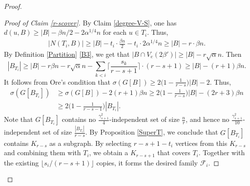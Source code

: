 \documentclass[11pt, a4paper]{article}
\theoremstyle{definition}
\newcommand{\<}{\subseteq}
\begin{document}
\begin{proof}
\begin{proof}[Proof of Claim \ref{r-scover}]
By Claim \ref{degree-V-S}, one has 
$d(u,B)\ge |B|- \beta n/2- 2\alpha^{1/4}n$ for each $u\in T_i$. 
Thus, 
\begin{align}\label{common-T}
|N(T_i,B)|\ge|B|-t_i \cdot \frac{\beta n}{2}-t_i\cdot 2\alpha^{1/4}n\ge |B|-r\cdot \beta n.
\end{align}
By Definition \ref{Partition} \ref{B3}, we get that $|B\cap V_e(2\beta')|\ge |B|-r\sqrt{\alpha} n.$ %
Then 
$$
|B_{T_i}|\ge |B|-r\beta n-r\sqrt{\alpha}n-\sum_{k<i}\Big\lceil \frac{s_k}{r-s+1}\Big\rceil\cdot (r-s+1) \ge |B|-(r+1)\beta n.%
$$ 
It follows from Ore's condition that  $\sigma(G[B])\geq 2\big(1-\frac{1}{r-s}\big)|B|-2.$
Thus,
\begin{align*}
    \sigma(G[B_{T_i}])&\geq \sigma(G[B])-2(r+1)\beta n\geq 2\Big(1-\frac{1}{r-s}\Big)|B|-(2r+3)\beta n\\
    &\geq 2\Big(1-\frac{1}{r-s-1}\Big)|B_{T_i}|.
\end{align*}
Note that $G[B_{T_i}]$ contains no $\frac{\gamma_{s+1}^2}{4}$-independent set of size $\frac{n}{r}$, and hence no $\frac{\gamma_{s+1}^2}{10}$-independent set of size $\frac{|B_{T_i}|}{r-s}$. By Proposition \ref{SuperT}, we conclude that $G[B_{T_i}]$ contains $K_{r-s}$ as a subgraph. By selecting $r-s+1-t_i$ vertices from this $K_{r-s}$ and combining them with $T_i$, we obtain a $K_{r-s+1}$ that covers $T_i$.  Together with the existing $\lfloor s_i/(r-s+1)\rfloor$ copies, it  forms the desired family $\mathcal{F}_i$.
\end{proof}


\end{proof}
\end{document}
